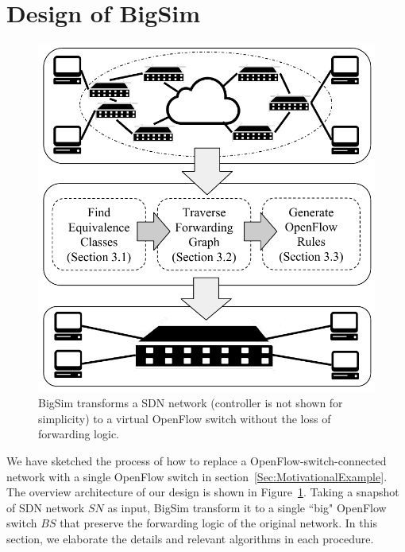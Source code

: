 \section{Design of BigSim}

\begin{figure}[h]
\centering
\includegraphics[scale=.6]{figures/BigSimOverview.pdf}
\caption{BigSim transforms a SDN network (controller is not shown for simplicity) to a virtual OpenFlow switch without the loss of forwarding logic.}
\label{Fig:BigSimOverview}
\end{figure}

We have sketched the process of how to replace a OpenFlow-switch-connected network
with a single OpenFlow switch in section~\ref{Sec:MotivationalExample}.
The overview architecture of our design is shown in Figure~\ref{Fig:BigSimOverview}.
Taking a snapshot of SDN network $SN$ as input, BigSim transform it to a single ``big"
OpenFlow switch $BS$ that preserve the forwarding logic of the original network.
In this section, we elaborate the details and relevant algorithms
in each procedure.


